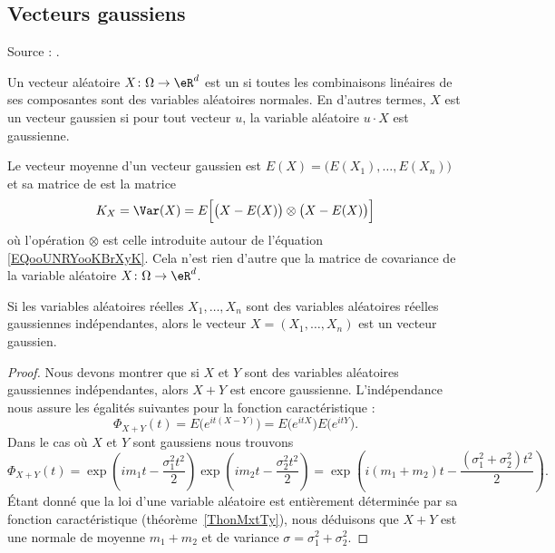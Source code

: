 \subsection{Vecteurs gaussiens}

Source : \cite{ProbaDanielLi,GaussienYoann}.

\begin{definition}
	Un vecteur aléatoire \( X\colon \Omega\to \eR^d\) est un  si toutes les combinaisons linéaires de ses composantes sont des variables aléatoires normales. En d'autres termes, \( X\) est un vecteur gaussien si pour tout vecteur \( u\), la variable aléatoire \( u\cdot X\) est gaussienne.
\end{definition}

Le vecteur moyenne d'un vecteur gaussien est \( E(X)=\big( E(X_1),\ldots, E(X_n) \big)\) et sa matrice de  est la matrice
\begin{equation}
	K_X=\Var(X)=E\Big[ \big( X-E(X) \big)\otimes \big( X-E(X) \big) \Big]
\end{equation}
où l'opération \( \otimes\) est celle introduite autour de l'équation \eqref{EQooUNRYooKBrXyK}. Cela n'est rien d'autre que la matrice de covariance de la variable aléatoire \( X\colon \Omega\to \eR^d\).

\begin{lemma}
	Si les variables aléatoires réelles \( X_1,\ldots, X_n\) sont des variables aléatoires réelles gaussiennes indépendantes, alors le vecteur \( X=(X_1,\ldots, X_n)\) est un vecteur gaussien.
\end{lemma}

\begin{proof}
	Nous devons montrer que si \( X\) et \( Y\) sont des variables aléatoires gaussiennes indépendantes, alors \( X+Y\) est encore gaussienne. L'indépendance nous assure les égalités suivantes pour la fonction caractéristique :
	\begin{equation}
		\Phi_{X+Y}(t)=E\big(  e^{it(X-Y)} \big)=E\big(  e^{itX} \big)E\big(  e^{itY} \big).
	\end{equation}
	Dans le cas où \( X\) et \( Y\) sont gaussiens nous trouvons
	\begin{equation}
		\Phi_{X+Y}(t)=\exp\left( im_1t-\frac{ \sigma_1^2t^2 }{2} \right)\exp\left( im_2t-\frac{ \sigma_2^2t^2 }{2} \right)=\exp\left( i(m_1+m_2)t-\frac{ (\sigma_1^2+\sigma_2^2)t^2 }{2} \right).
	\end{equation}
	Étant donné que la loi d'une variable aléatoire est entièrement déterminée par sa fonction caractéristique (théorème~\ref{ThonMxtTy}), nous déduisons que \( X+Y\) est une normale de moyenne \( m_1+m_2\) et de variance \( \sigma=\sigma_1^2+\sigma_2^2\).
\end{proof}

